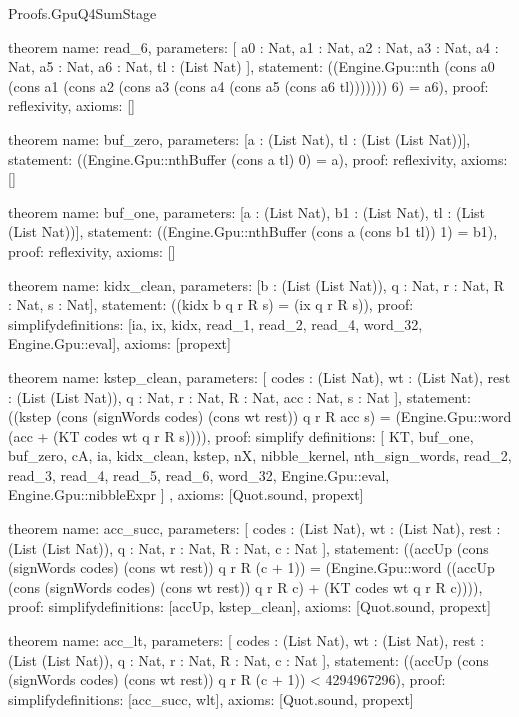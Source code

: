 \begin{lexlean}{Proofs.GpuQ4SumStage}
\begin{semanticmodule}
theorem{
  name: read_6,
  parameters: [
    a0 : Nat,
    a1 : Nat,
    a2 : Nat,
    a3 : Nat,
    a4 : Nat,
    a5 : Nat,
    a6 : Nat,
    tl : (List Nat)
  ],
  statement: ((Engine.Gpu::nth (cons a0 (cons a1 (cons a2 (cons a3 (cons a4 (cons a5 (cons a6 tl))))))) 6) = a6),
  proof: reflexivity{},
  axioms: []
}

theorem{
  name: buf_zero,
  parameters: [a : (List Nat), tl : (List (List Nat))],
  statement: ((Engine.Gpu::nthBuffer (cons a tl) 0) = a),
  proof: reflexivity{},
  axioms: []
}

theorem{
  name: buf_one,
  parameters: [a : (List Nat), b1 : (List Nat), tl : (List (List Nat))],
  statement: ((Engine.Gpu::nthBuffer (cons a (cons b1 tl)) 1) = b1),
  proof: reflexivity{},
  axioms: []
}

theorem{
  name: kidx_clean,
  parameters: [b : (List (List Nat)), q : Nat, r : Nat, R : Nat, s : Nat],
  statement: ((kidx b q r R s) = (ix q r R s)),
  proof: simplify{definitions: [ia, ix, kidx, read_1, read_2, read_4, word_32, Engine.Gpu::eval]},
  axioms: [propext]
}

theorem{
  name: kstep_clean,
  parameters: [
    codes : (List Nat),
    wt : (List Nat),
    rest : (List (List Nat)),
    q : Nat,
    r : Nat,
    R : Nat,
    acc : Nat,
    s : Nat
  ],
  statement: ((kstep (cons (signWords codes) (cons wt rest)) q r R acc s) = (Engine.Gpu::word (acc + (KT codes wt q r R s)))),
  proof: simplify{
    definitions: [
      KT,
      buf_one,
      buf_zero,
      cA,
      ia,
      kidx_clean,
      kstep,
      nX,
      nibble_kernel,
      nth_sign_words,
      read_2,
      read_3,
      read_4,
      read_5,
      read_6,
      word_32,
      Engine.Gpu::eval,
      Engine.Gpu::nibbleExpr
    ]
  },
  axioms: [Quot.sound, propext]
}

theorem{
  name: acc_succ,
  parameters: [
    codes : (List Nat),
    wt : (List Nat),
    rest : (List (List Nat)),
    q : Nat,
    r : Nat,
    R : Nat,
    c : Nat
  ],
  statement: ((accUp (cons (signWords codes) (cons wt rest)) q r R (c + 1)) = (Engine.Gpu::word ((accUp (cons (signWords codes) (cons wt rest)) q r R c) + (KT codes wt q r R c)))),
  proof: simplify{definitions: [accUp, kstep_clean]},
  axioms: [Quot.sound, propext]
}

theorem{
  name: acc_lt,
  parameters: [
    codes : (List Nat),
    wt : (List Nat),
    rest : (List (List Nat)),
    q : Nat,
    r : Nat,
    R : Nat,
    c : Nat
  ],
  statement: ((accUp (cons (signWords codes) (cons wt rest)) q r R (c + 1)) < 4294967296),
  proof: simplify{definitions: [acc_succ, wlt]},
  axioms: [Quot.sound, propext]
}


\end{semanticmodule}
\end{lexlean}
